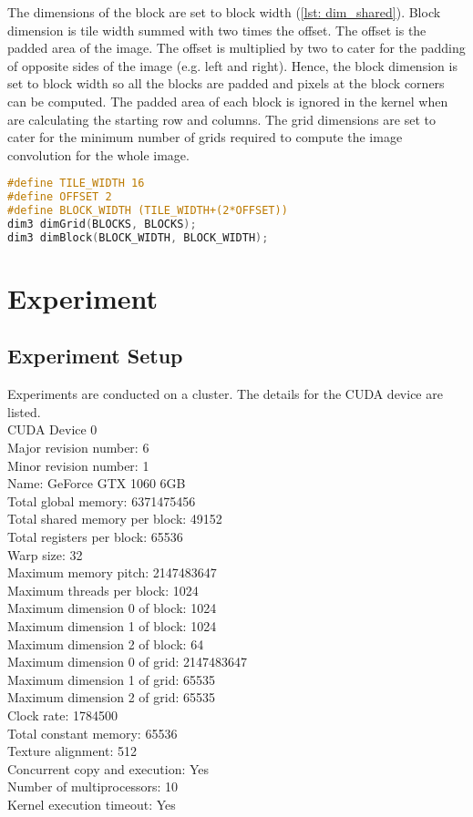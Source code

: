 The dimensions of the block are set to block width (\ref{lst: dim_shared}). Block dimension is tile width summed with two times the offset. The offset is the padded area of the image. The offset is multiplied by two to cater for the padding of opposite sides of the image (e.g. left and right). Hence, the block dimension is set to block width so all the blocks are padded and pixels at the block corners can be computed. The padded area of each block is ignored in the kernel when are calculating the starting row and columns. The grid dimensions are set to cater for the minimum number of grids required to compute the image convolution for the whole image.
\begin{lstlisting}[language=C, label={lst: dim_shared}, caption= Shared memory kernel dimensions]
#define TILE_WIDTH 16
#define OFFSET 2
#define BLOCK_WIDTH (TILE_WIDTH+(2*OFFSET))
dim3 dimGrid(BLOCKS, BLOCKS);
dim3 dimBlock(BLOCK_WIDTH, BLOCK_WIDTH);
\end{lstlisting}


\section{Experiment} 
\subsection{Experiment Setup}
Experiments are conducted on a cluster. The details for the CUDA device are listed.\\
CUDA Device 0\\
Major revision number:         6\\
Minor revision number:         1\\
Name:                          GeForce GTX 1060 6GB \\ 
Total global memory:           6371475456 \\
Total shared memory per block: 49152 \\
Total registers per block:     65536 \\
Warp size:                     32 \\ 
Maximum memory pitch:          2147483647 \\
Maximum threads per block:     1024 \\
Maximum dimension 0 of block:  1024 \\
Maximum dimension 1 of block:  1024 \\
Maximum dimension 2 of block:  64 \\
Maximum dimension 0 of grid:   2147483647 \\
Maximum dimension 1 of grid:   65535 \\
Maximum dimension 2 of grid:   65535 \\
Clock rate:                    1784500 \\
Total constant memory:         65536 \\
Texture alignment:             512 \\
Concurrent copy and execution: Yes \\
Number of multiprocessors:     10 \\
Kernel execution timeout:      Yes \\

